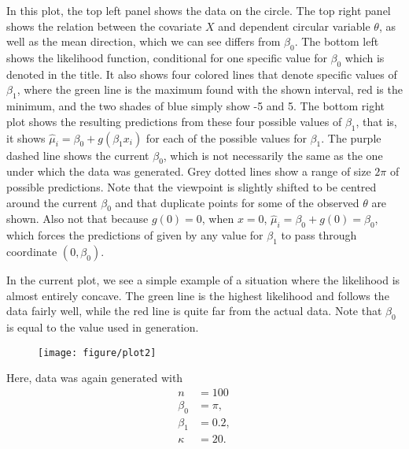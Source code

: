 \documentclass{article}\usepackage[]{graphicx}\usepackage[]{color}
\makeatletter
\def\maxwidth{ %
  \ifdim\Gin@nat@width>\linewidth
    \linewidth
  \else
    \Gin@nat@width
  \fi
}
\newenvironment{knitrout}{}{} %
\makeatother
\begin{document}
In this plot, the top left panel shows the data on the circle. The top right panel shows the relation between the covariate $X$ and dependent circular variable $\theta$, as well as the mean direction, which we can see differs from $\beta_0$. The bottom left shows the likelihood function, conditional for one specific value for $\beta_0$ which is denoted in the title. It also shows four colored lines that denote specific values of $\beta_1$, where the green line is the maximum found with the shown interval, red is the minimum, and the two shades of blue simply show -5 and 5. The bottom right plot shows the resulting predictions from these four possible values of $\beta_1$, that is, it shows $\hat\mu_i = \beta_0 + g(\beta_1 x_i)$ for each of the possible values for $\beta_1$. The purple dashed line shows the current $\beta_0$, which is not necessarily the same as the one under which the data was generated. Grey dotted lines show a range of size $2\pi$ of possible predictions. Note that the viewpoint is slightly shifted to be centred around the current $\beta_0$ and that duplicate points for some of the observed $\theta$ are shown. Also not that because $g(0) = 0$, when $x=0$, $\hat\mu_i = \beta_0 + g(0) = \beta_0$, which forces the predictions of given by any value for $\beta_1$ to pass through coordinate $(0, \beta_0)$.

In the current plot, we see a simple example of a situation where the likelihood is almost entirely concave. The green line is the highest likelihood and follows the data fairly well, while the red line is quite far from the actual data. Note that $\beta_0$ is equal to the value used in generation.

\newpage

\begin{figure}[t!]
\begin{knitrout}
\color{fgcolor}

{\centering \texttt{[image: figure/plot2]} 

}



\end{knitrout}

\end{figure}

Here, data was again generated with
\begin{align*}
n &= 100 \\
\beta_0 &= \pi, \\
\beta_1 &= 0.2, \\
\kappa &= 20.
\end{align*}
\end{document}
